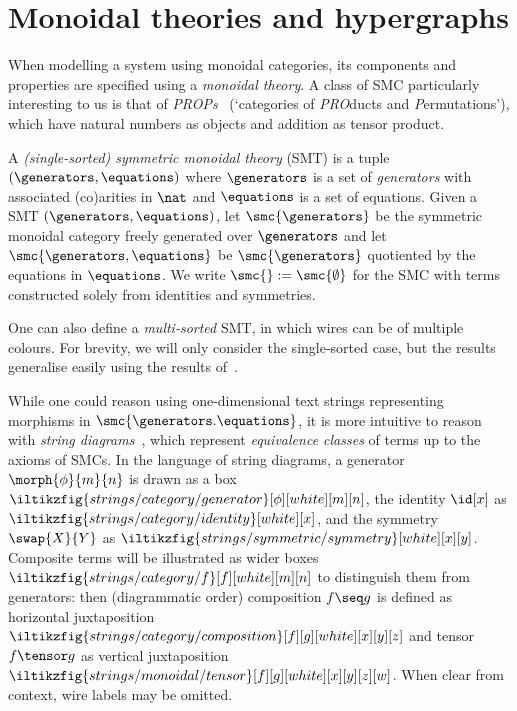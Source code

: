 \section{Monoidal theories and hypergraphs}

When modelling a system using monoidal categories, its components and
properties are specified using a \emph{monoidal theory}.
A class of SMC particularly interesting to us is that of
\emph{PROPs}~\cite{maclane1965categorical} (`categories of \emph{PRO}ducts and
\emph{P}ermutations'), which have natural numbers as objects and addition as
tensor product.

\begin{definition}
    A \emph{(single-sorted) symmetric monoidal theory} (SMT) is a tuple \(
        (\generators,\equations)
    \) where \(\generators\) is a set of \emph{generators} with associated
    (co)arities in \(\nat\) and \(\equations\) is a set of equations.
    Given a SMT \((\generators,\equations)\), let \(
        \smc{\generators}
    \) be the symmetric monoidal category freely generated over \(\generators\)
    and let \(
        \smc{\generators,\equations}
    \) be \(\smc{\generators}\) quotiented by the equations in \(\equations\).
    We write \(\smc{} := \smc{\emptyset}\) for the SMC with terms constructed
    solely from identities and symmetries.
\end{definition}

\begin{remark}
    One can also define a \emph{multi-sorted} SMT, in which wires can be of
    multiple colours.
    For brevity, we will only consider the single-sorted case, but the results
    generalise easily using the results
    of~\cite{bonchi2022string,bonchi2022string}.
\end{remark}

While one could reason using one-dimensional text strings representing morphisms
in \(\smc{\generators.\equations}\), it is more intuitive to reason with
\emph{string diagrams}~\cite{joyal1991geometry,selinger2011survey}, which
represent \emph{equivalence classes} of terms up to the axioms of SMCs.
In the language of string diagrams, a generator \(\morph{\phi}{m}{n}\) is drawn
as a box \(
    \iltikzfig{strings/category/generator}[\phi][white][m][n]
\), the identity \(\id[x]\) as \(
    \iltikzfig{strings/category/identity}[white][x]
\), and the symmetry \(\swap{X}{Y}\) as \(
    \iltikzfig{strings/symmetric/symmetry}[white][x][y]
\).
Composite terms will be illustrated as wider boxes \(
    \iltikzfig{strings/category/f}[f][white][m][n]
\) to distinguish them from generators: then (diagrammatic order) composition
\(f \seq g\) is defined as horizontal juxtaposition \(
    \iltikzfig{strings/category/composition}[f][g][white][x][y][z]
\) and tensor \(f \tensor g\) as vertical juxtaposition \(
    \iltikzfig{strings/monoidal/tensor}[f][g][white][x][y][z][w]
\).
When clear from context, wire labels may be omitted.


